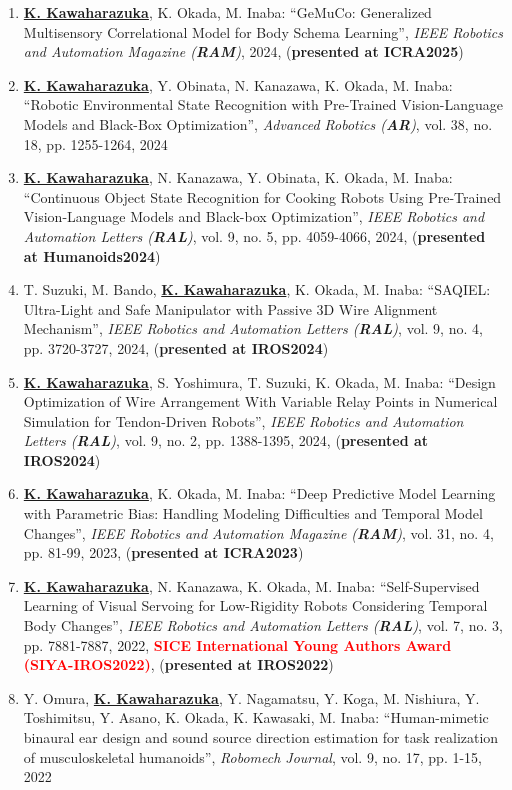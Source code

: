 \documentclass[letterpaper]{article}
\begin{document}
\begin{enumerate}
\item \underline{\textbf{K. Kawaharazuka}}, K. Okada, M. Inaba: ``GeMuCo: Generalized Multisensory Correlational Model for Body Schema Learning'', \textit{IEEE Robotics and Automation Magazine (\textit{\textbf{RAM}})}, 2024, (\textbf{presented at ICRA2025})
\item \underline{\textbf{K. Kawaharazuka}}, Y. Obinata, N. Kanazawa, K. Okada, M. Inaba: ``Robotic Environmental State Recognition with Pre-Trained Vision-Language Models and Black-Box Optimization'', \textit{Advanced Robotics (\textit{\textbf{AR}})}, vol. 38, no. 18, pp. 1255-1264, 2024
\item \underline{\textbf{K. Kawaharazuka}}, N. Kanazawa, Y. Obinata, K. Okada, M. Inaba: ``Continuous Object State Recognition for Cooking Robots Using Pre-Trained Vision-Language Models and Black-box Optimization'', \textit{IEEE Robotics and Automation Letters (\textit{\textbf{RAL}})}, vol. 9, no. 5, pp. 4059-4066, 2024, (\textbf{presented at Humanoids2024})
\item T. Suzuki, M. Bando, \underline{\textbf{K. Kawaharazuka}}, K. Okada, M. Inaba: ``SAQIEL: Ultra-Light and Safe Manipulator with Passive 3D Wire Alignment Mechanism'', \textit{IEEE Robotics and Automation Letters (\textit{\textbf{RAL}})}, vol. 9, no. 4, pp. 3720-3727, 2024, (\textbf{presented at IROS2024})
\item \underline{\textbf{K. Kawaharazuka}}, S. Yoshimura, T. Suzuki, K. Okada, M. Inaba: ``Design Optimization of Wire Arrangement With Variable Relay Points in Numerical Simulation for Tendon-Driven Robots'', \textit{IEEE Robotics and Automation Letters (\textit{\textbf{RAL}})}, vol. 9, no. 2, pp. 1388-1395, 2024, (\textbf{presented at IROS2024})
\item \underline{\textbf{K. Kawaharazuka}}, K. Okada, M. Inaba: ``Deep Predictive Model Learning with Parametric Bias: Handling Modeling Difficulties and Temporal Model Changes'', \textit{IEEE Robotics and Automation Magazine (\textit{\textbf{RAM}})}, vol. 31, no. 4, pp. 81-99, 2023, (\textbf{presented at ICRA2023})
\item \underline{\textbf{K. Kawaharazuka}}, N. Kanazawa, K. Okada, M. Inaba: ``Self-Supervised Learning of Visual Servoing for Low-Rigidity Robots Considering Temporal Body Changes'', \textit{IEEE Robotics and Automation Letters (\textit{\textbf{RAL}})}, vol. 7, no. 3, pp. 7881-7887, 2022, \textbf{\textcolor{red}{SICE International Young Authors Award (SIYA-IROS2022)}}, (\textbf{presented at IROS2022})
\item Y. Omura, \underline{\textbf{K. Kawaharazuka}}, Y. Nagamatsu, Y. Koga, M. Nishiura, Y. Toshimitsu, Y. Asano, K. Okada, K. Kawasaki, M. Inaba: ``Human-mimetic binaural ear design and sound source direction estimation for task realization of musculoskeletal humanoids'', \textit{Robomech Journal}, vol. 9, no. 17, pp. 1-15, 2022

\end{enumerate}
\end{document}
